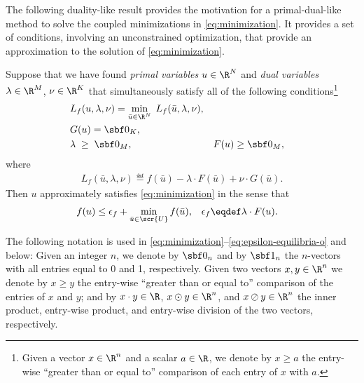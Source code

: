 \documentclass[11pt]{article}
\begin{document}
The following duality-like result provides the motivation for a
primal-dual-like method to solve the coupled minimizations in
\eqref{eq:minimization}. It provides a set of
conditions, involving an unconstrained optimization, that provide an
approximation to the solution of \eqref{eq:minimization}.
\begin{lemma}\label{le:minima-gap}
  Suppose that we have found \emph{primal variables} $u\in\R^{N}$
  and \emph{dual variables} $\lambda\in\R^{M}$, $\nu\in\R^{K}$ that
  simultaneously satisfy all of the following
  conditions\footnote{Given a vector $x\in\R^n$ and a scalar $a\in\R$, we
    denote by $x\ge a$ the entry-wise ``greater than or equal to''
    comparison of each entry of $x$ with $a$.}
  \begin{subequations}
    \begin{align}
      \label{eq:central-points}
      &L_f(u,\lambda,\nu) =\min_{\bar u\in\R^{N}}\; L_f(\bar u,\lambda,\nu), \\
      \label{eq:equality-constraints}
      &G(u)=\sbf 0_K, \\
      \label{eq:inequality-constraints}
      &\lambda\;\ge\;\sbf 0_M, & &F(u)\ge\sbf 0_M,
    \end{align}
  \end{subequations}
  where
  \begin{align*}
    L_f(\bar u,\lambda,\nu)\eqdef f(\bar u)-\lambda\cdot F(\bar u)+\nu\cdot G(\bar u). 
  \end{align*}
  Then $u$ approximately
  satisfies \eqref{eq:minimization} in the sense that
  \begin{align}\label{eq:epsilon-equilibria-o}
    f(u)&\le\epsilon_f+\min_{\bar u\in\scr{U}} f(\bar u), &
    \epsilon_f&\eqdef \lambda\cdot F(u).
  \end{align}
  \frqed
\end{lemma}
The following notation is used in
\eqref{eq:minimization}--\eqref{eq:epsilon-equilibria-o} and below:
Given an integer $n$, we denote by $\sbf 0_n$ and by $\sbf 1_n$ the
$n$-vectors with all entries equal to 0 and 1, respectively. Given two
vectors $x,y\in\R^n$ we denote by $x\ge y$ the entry-wise ``greater than or
equal to'' comparison of the entries of $x$ and $y$; and by $x\cdot y\in\R$,
$x\odot y\in\R^n$, and $x\oslash y\in\R^n$ the inner product, entry-wise
product, and entry-wise division of the two vectors, respectively.
\end{document}
